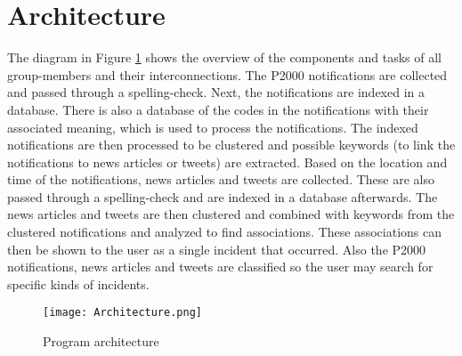 \newpage
\section{Architecture}
The diagram in Figure \ref{fig:Architecture} shows the overview of the components and tasks of all group-members and their interconnections. The P2000 notifications are collected and passed through a spelling-check. Next, the notifications are indexed in a database. There is also a database of the codes in the notifications with their associated meaning, which is used to process the notifications. The indexed notifications are then processed to be clustered and possible keywords (to link the notifications to news articles or tweets) are extracted. Based on the location and time of the notifications, news articles and tweets are collected. These are also passed through a spelling-check and are indexed in a database afterwards. The news articles and tweets are then clustered and combined with keywords from the clustered notifications and analyzed to find associations. These associations can then be shown to the user as a single incident that occurred. Also the P2000 notifications, news articles and tweets are classified so the user may search for specific kinds of incidents. 

\begin{figure}[h!]
  \texttt{[image: Architecture.png]}
  \caption{Program architecture}
  \label{fig:Architecture}
\end{figure}